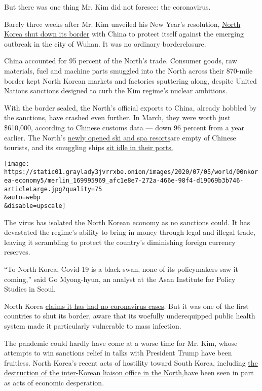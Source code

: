 But there was one thing Mr. Kim did not foresee: the coronavirus.

Barely three weeks after Mr. Kim unveiled his New Year's resolution,
\href{https://www.nytimes3xbfgragh.onion/2020/03/31/world/asia/north-korea-coronavirus.html}{North
Korea shut down ​its border} with China to protect itself against the
emerging outbreak in the city of Wuhan. It was no ordinary border​
closure.

China accounted for 95 percent of the North's trade. Consumer goods, raw
materials, fuel and machine parts smuggled into the North across their
870-mile border kept North Korean markets and factories sputtering
along, despite United Nations sanctions designed to curb the Kim
regime's nuclear ambitions.

With the border sealed, the North's official exports to China, already
hobbled by the sanctions, have crashed even further. In March, they were
worth just \$610,000, according to Chinese customs data --- down 96
percent from a year earlier. The North's
\href{https://www.nytimes3xbfgragh.onion/2019/12/03/world/asia/north-korea-resorts-sanctions.html}{newly
opened ski and spa resorts}are empty of Chinese tourists, and its
smuggling ships
\href{https://www.nytimes3xbfgragh.onion/2020/03/26/video/coronavirus-north-korea.html}{sit
idle in their ports.}

\texttt{[image: https://static01.graylady3jvrrxbe.onion/images/2020/07/05/world/00nkorea-economy5/merlin\_169995969\_afc1e8e7-272a-466e-98f4-d19069b3b746-articleLarge.jpg?quality=75\\\&auto=webp\\\&disable=upscale]}

The virus has isolated the North Korean economy as no sanctions could.
It has devastated the regime's ability to bring in money through legal
and illegal trade, leaving it scrambling to protect the country's
diminishing foreign currency reserves.

``To North Korea, Covid-19 is a black swan, none of its policymakers saw
it coming,'' said Go Myong-hyun, an analyst at the Asan Institute for
Policy Studies in Seoul.

​North Korea
\href{https://www.nytimes3xbfgragh.onion/2020/03/31/world/asia/north-korea-coronavirus.html}{claims
it has had no coronavirus cases}. But it was one of the first countries
to shut its border, aware that its woefully underequipped public health
system made it particularly vulnerable to mass infection.

The pandemic could hardly have come at a worse time for Mr. Kim, whose
attempts to win sanctions relief in talks with President Trump have been
fruitless. North Korea's recent acts of hostility toward South Korea,
including
\href{https://www.nytimes3xbfgragh.onion/2020/06/16/world/asia/north-korea-explosion-liaison-office.html}{the
destruction of the inter-Korean liaison office in the North,}have been
seen in part as acts of economic desperation.


